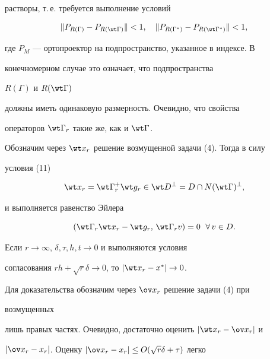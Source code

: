 растворы, т.\,е. требуется выполнение условий 


$$ 


\|P_{R(\Gamma)}-P_{R(\wt\Gamma)}\|<1,\quad 


\|P_{R(\Gamma^*)}-P_{R(\wt\Gamma^*)}\|<1, 


$$ 


где $P_M$ --- ортопроектор на подпространство, указанное в индексе. В  


конечномерном случае это означает, что подпространства 


$R(\Gamma)$ и $R(\wt\Gamma)$ 


должны иметь одинаковую размерность. Очевидно, что свойства  


операторов $\wt\Gamma_r$ такие же, как и $\wt\Gamma$. 


 


Обозначим через $\wt x_r$ решение возмущенной задачи (4). Тогда в силу  


условия (11)


$$


\wt x_r= \wt\Gamma^+_r\wt g_r\in\wt D^\bot=D\cap 


N(\wt\Gamma)^\bot,


$$


и выполняется равенство Эйлера 


$$ 


(\wt\Gamma_r\wt x_r-\wt g_r,\,\wt\Gamma_r v)=0\ \; 


\forall\,v\in D. 


$$ 


 


\begin{thm} 


Если $r\to\infty$, $\delta,\tau,h,t\to0$ и выполняются условия  


согласования $r h+\sqrt{r}\delta\to0$, то $|\wt x_r-x^*|\to0$. 


\end{thm} 


 


Для доказательства обозначим через $\ov x_r$ решение задачи (4) при 


возмущенных  


лишь правых частях. Очевидно, достаточно оценить $|\wt x_r-\ov x_r|$ и  


$|\ov x_r-x_r|$. Оценку $|\ov x_r-x_r|\le O(\sqrt{r}\delta+\tau)$ легко 


